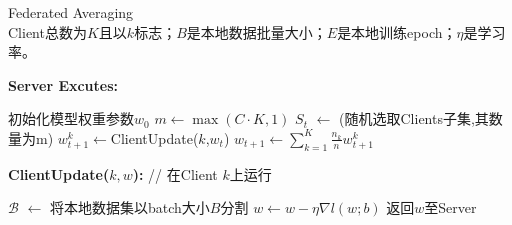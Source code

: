 \renewcommand{\algorithmiccomment}[1]{// #1}
\begin{algorithm}[h]
\caption{Federated Averaging\\
Client总数为$K$且以$k$标志；$B$是本地数据批量大小；$E$是本地训练epoch；$\eta$是学习率。}
\label{FedAvg}
{\bfseries Server Excutes:}
\begin{algorithmic}
\STATE 初始化模型权重参数$w_0$
\STATE $m \leftarrow \max(C\cdot K,1)$
\STATE $S_t$ $\leftarrow$ (随机选取Clients子集,其数量为m)
\STATE $w_{t+1}^{k}\leftarrow$ClientUpdate($k$,$w_t$) 
\ENDFOR
\STATE $w_{t+1}\leftarrow\sum_{k=1}^{K}\frac{n_k}{n}w_{t+1}^k$
\ENDFOR
\end{algorithmic}

{\bfseries ClientUpdate($k,w$):} // 在Client $k$上运行
\begin{algorithmic}
\STATE $\mathcal{B}$ $\leftarrow$ 将本地数据集以batch大小$B$分割
\STATE $w\leftarrow w-\eta\nabla{l(w;b)}$
\ENDFOR
\ENDFOR
\STATE 返回$w$至Server
\end{algorithmic}
\end{algorithm}

